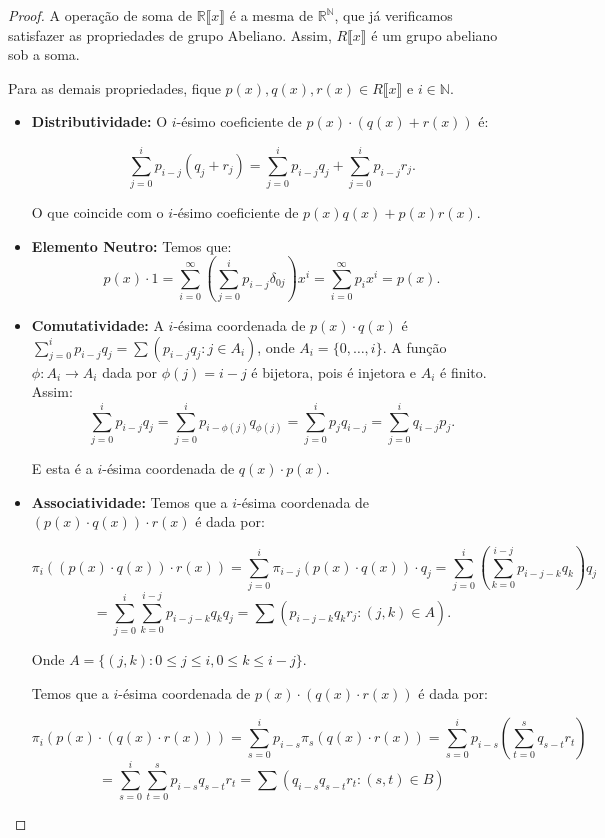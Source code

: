 \begin{proof}
    A operação de soma de $\mathbb R\llbracket x \rrbracket$ é a mesma de $\mathbb R^{\mathbb N}$, que já verificamos satisfazer as propriedades de grupo Abeliano. Assim, $R\llbracket x \rrbracket$ é um grupo abeliano sob a soma.

    Para as demais propriedades, fique $p(x), q(x), r(x) \in R\llbracket x \rrbracket$ e $i \in \mathbb N$.
    \begin{itemize}
        \item \textbf{Distributividade:} O $i$-ésimo coeficiente de $p(x)\cdot (q(x)+r(x))$ é:
        
        \[\sum_{j=0}^i p_{i-j}(q_j+r_j)=\sum_{j=0}^i p_{i-j}q_j+\sum_{j=0}^i p_{i-j}r_j.\]

        O que coincide com o $i$-ésimo coeficiente de $p(x)q(x)+p(x)r(x)$.
        \item \textbf{Elemento Neutro:} Temos que:
        \[p(x)\cdot 1=\sum_{i=0}^\infty\left(\sum_{j=0}^i p_{i-j}\delta_{0j}\right)x^i=\sum_{i=0}^\infty p_ix^i=p(x).\]
        \item \textbf{Comutatividade:} A $i$-ésima coordenada de $p(x)\cdot q(x)$ é $\sum_{j=0}^i p_{i-j}q_j=\sum(p_{i-j}q_j: j \in A_i)$, onde $A_i=\{0, \dots, i\}$. A função $\phi: A_i\rightarrow A_i$ dada por $\phi(j)=i-j$ é bijetora, pois é injetora e $A_i$ é finito. Assim:
        \[\sum_{j=0}^i p_{i-j}q_j=\sum_{j=0}^ip_{i-\phi(j)}q_{\phi(j)}=\sum_{j=0}^ip_{j}q_{i-j}=\sum_{j=0}^iq_{i-j}p_{j}.\]

        E esta é a $i$-ésima coordenada de $q(x)\cdot p(x)$.

        \item \textbf{Associatividade:} Temos que a $i$-ésima coordenada de $(p(x)\cdot q(x))\cdot r(x)$ é dada por:

        \[\pi_i((p(x)\cdot q(x))\cdot r(x))=\sum_{j=0}^i\pi_{i-j}(p(x)\cdot q(x))\cdot q_j=\sum_{j=0}^i\left(\sum_{k=0}^{i-j}p_{i-j-k}q_k\right) q_j\]
        \[=\sum_{j=0}^{i}\sum_{k=0}^{i-j}p_{i-j-k}q_kq_j=\sum \left(p_{i-j-k}q_kr_j:(j, k)\in A\right).\]

        Onde $A=\{(j, k): 0\leq j\leq i, 0\leq k\leq i-j\}$.

        Temos que a $i$-ésima coordenada de $p(x)\cdot (q(x)\cdot r(x))$ é dada por:

        $$\pi_i(p(x)\cdot (q(x)\cdot r(x)))=\sum_{s=0}^ip_{i-s}\pi_s(q(x)\cdot r(x))=\sum_{s=0}^ip_{i-s}\left(\sum_{t=0}^sq_{s-t}r_t\right)$$
        $$=\sum_{s=0}^i\sum_{t=0}^sp_{i-s}q_{s-t}r_t=\sum\left(q_{i-s}q_{s-t}r_t:(s, t)\in B\right)$$
        

\end{itemize}
\end{proof}
